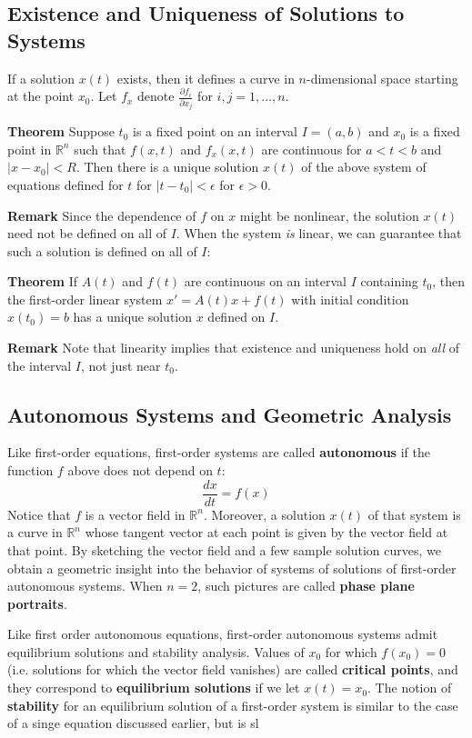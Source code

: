 \documentclass[12pt]{article}
\newcommand{\R}{\mathbb{R}}
\begin{document}
\subsection{Existence and Uniqueness of Solutions to Systems}

If a solution $x(t)$ exists, then it defines a curve in $n$-dimensional space starting at the point $x_0$. Let $f_x$ denote $\frac{\partial f_i}{\partial x_j}$ for $i, j = 1, \ldots, n$.

\textbf{Theorem} Suppose $t_0$ is a fixed point on an interval $I = (a,b)$ and $x_0$ is a fixed point in $\R^n$ such that $f(x,t)$ and $f_x(x,t)$ are continuous for $a < t < b$ and $|x - x_0| < R$. Then there is a unique solution $x(t)$ of the above system of equations defined for $t$ for $|t - t_0| < \epsilon$ for $\epsilon > 0$.

\textbf{Remark} Since the dependence of $f$ on $x$ might be nonlinear, the solution $x(t)$ need not be defined on all of $I$. When the system \textit{is} linear, we can guarantee that such a solution is defined on all of $I$:

\textbf{Theorem} If $A(t)$ and $f(t)$ are continuous on an interval $I$ containing $t_0$, then the first-order linear system $x' = A(t)x + f(t)$ with initial condition $x(t_0) = b$ has a unique solution $x$ defined on $I$.

\textbf{Remark} Note that linearity implies that existence and uniqueness hold on \textit{all} of the interval $I$, not just near $t_0$.

\subsection{Autonomous Systems and Geometric Analysis}

Like first-order equations, first-order systems are called \textbf{autonomous} if the function $f$ above does not depend on $t$: $$\frac{dx}{dt} = f(x)$$ Notice that $f$ is a vector field in $\R^n$. Moreover, a solution $x(t)$ of that system is a curve in $\R^n$ whose tangent vector at each point is given by the vector field at that point. By sketching the vector field and a few sample solution curves, we obtain a geometric insight into the behavior of systems of solutions of first-order autonomous systems. When $n=2$, such pictures are called \textbf{phase plane portraits}.

Like first order autonomous equations, first-order autonomous systems admit equilibrium solutions and stability analysis. Values of $x_0$ for which $f(x_0)=0$ (i.e. solutions for which the vector field vanishes) are called \textbf{critical points}, and they correspond to \textbf{equilibrium solutions} if we let $x(t) = x_0$. The notion of \textbf{stability} for an equilibrium solution of a first-order system is similar to the case of a singe equation discussed earlier, but is sl
\end{document}
